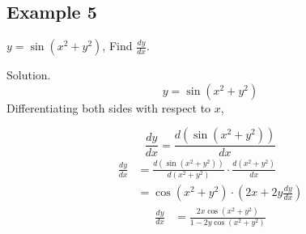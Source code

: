 \subsection*{Example 5}
\(y = \sin (x^2 + y^2)\), Find \(\frac{dy}{dx}\).

Solution. 
\[
y = \sin (x^2 + y^2)
\]
Differentiating both sides with respect to \(x\),

\[
\frac{dy}{dx} = \frac{d (\sin (x^2 + y^2))}{dx}
\]
\begin{align*}
\frac{dy}{dx} &= \frac{d (\sin (x^2 + y^2))}{d (x^2 + y^2)} \cdot \frac{d (x^2 + y^2)}{dx} \\
&= \cos (x^2 + y^2) \cdot \left( 2x + 2y \frac{dy}{dx} \right)
\end{align*}
\begin{align*}
\frac{dy}{dx} &= \frac{2x \cos (x^2 + y^2)}{1 - 2y \cos (x^2 + y^2)}
\end{align*}
